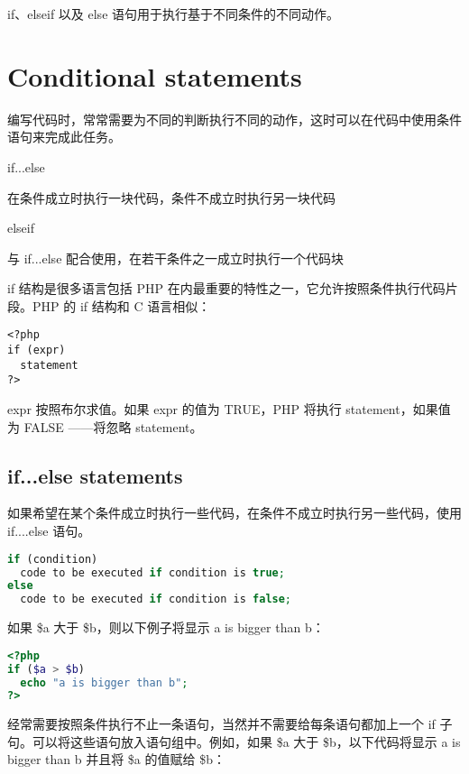 if、elseif 以及 else 语句用于执行基于不同条件的不同动作。



\section{Conditional statements}

编写代码时，常常需要为不同的判断执行不同的动作，这时可以在代码中使用条件语句来完成此任务。

\begin{compactitem}
\item if...else

在条件成立时执行一块代码，条件不成立时执行另一块代码

\item elseif

与 if...else 配合使用，在若干条件之一成立时执行一个代码块
\end{compactitem}

if 结构是很多语言包括 PHP 在内最重要的特性之一，它允许按照条件执行代码片段。PHP 的 if 结构和 C 语言相似：

\begin{verbatim}
<?php
if (expr)
  statement
?>
\end{verbatim}

expr 按照布尔求值。如果 expr 的值为 TRUE，PHP 将执行 statement，如果值为 FALSE ——将忽略 statement。



\subsection{if...else statements}

如果希望在某个条件成立时执行一些代码，在条件不成立时执行另一些代码，使用 if....else 语句。

\begin{lstlisting}[language=PHP]
if (condition)
  code to be executed if condition is true;
else
  code to be executed if condition is false; 
\end{lstlisting}


如果 \$a 大于 \$b，则以下例子将显示 a is bigger than b：

\begin{lstlisting}[language=PHP]
<?php
if ($a > $b)
  echo "a is bigger than b";
?>
\end{lstlisting}

经常需要按照条件执行不止一条语句，当然并不需要给每条语句都加上一个 if 子句。可以将这些语句放入语句组中。例如，如果 \$a 大于 \$b，以下代码将显示 a is bigger than b 并且将 \$a 的值赋给 \$b：

